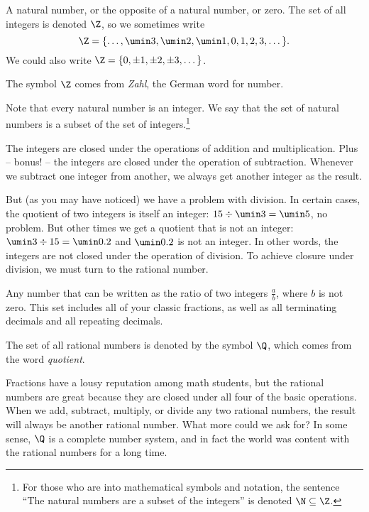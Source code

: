 \begin{boxdef}[Integer]
A natural number, or the opposite of a natural number, or zero. The set of all integers is denoted $\Z$, so we sometimes write \[\Z = \{\dotsc, \umin3, \umin2, \umin1, 0, 1, 2, 3, \dotsc \}.\]
We could also write $\Z = \{0, \pm1, \pm2, \pm3, \dotsc\}$.

The symbol $\Z$ comes from \textit{Zahl}, the German word for number.
\end{boxdef}

Note that every natural number is an integer. We say that the set of natural numbers is a \gls{subset} of the set of integers.\footnote{For those who are into mathematical symbols and notation, the sentence ``The natural numbers are a subset of the integers'' is denoted $\N \subseteq \Z$.}

The integers are closed under the operations of addition and multiplication. Plus -- bonus! -- the integers are closed under the operation of subtraction. Whenever we subtract one integer from another, we always get another integer as the result.

But (as you may have noticed) we have a problem with division. In certain cases, the quotient of two integers is itself an integer: $15 \div \umin3 = \umin5$, no problem. But other times we get a quotient that is not an integer: $\umin3 \div 15 = \umin0.2$ and $\umin0.2$ is not an integer. In other words, the integers are not closed under the operation of division. To achieve closure under division, we must turn to the \gls{rational number}.

\begin{boxdef}
\label{def:rationals}
Any number that can be written as the ratio of two integers $\frac{a}{b}$, where $b$ is not zero. This set includes all of your classic fractions, as well as all terminating decimals and all repeating decimals.


The set of all rational numbers is denoted by the symbol $\Q$, which comes from the word \textit{quotient}.
\end{boxdef}

Fractions have a lousy reputation among math students, but the rational numbers are great because they are closed under all four of the basic operations. When we add, subtract, multiply, or divide any two rational numbers, the result will always be another rational number. What more could we ask for? In some sense, $\Q$ is a complete number system, and in fact the world was content with the rational numbers for a long time.

